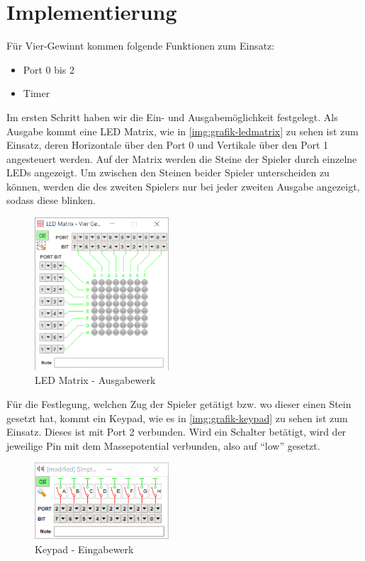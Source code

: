 \FloatBarrier
\chapter{Implementierung}
Für Vier-Gewinnt kommen folgende Funktionen zum Einsatz:
\begin{itemize}	
	\item Port 0 bis 2
	\item Timer
\end{itemize}

Im ersten Schritt haben wir die Ein- und Ausgabemöglichkeit festgelegt. Als Ausgabe kommt eine LED Matrix, wie in \autoref{img:grafik-ledmatrix} zu sehen ist zum Einsatz, deren Horizontale über den Port 0 und Vertikale über den Port 1 angesteuert werden. Auf der Matrix werden die Steine der Spieler durch einzelne LEDs angezeigt.
Um zwischen den Steinen beider Spieler unterscheiden zu können, werden die des zweiten Spielers nur bei jeder zweiten Ausgabe angezeigt, sodass diese blinken.


\begin{figure}
	\centering
	\includegraphics[width=5cm]{ledmatrix.png}
	\caption{LED Matrix - Ausgabewerk}
	\label{img:grafik-ledmatrix}
\end{figure}

Für die Festlegung, welchen Zug der Spieler getätigt bzw. wo dieser einen Stein gesetzt hat, kommt ein Keypad, wie es in \autoref{img:grafik-keypad} zu sehen ist zum Einsatz.
Dieses ist mit Port 2 verbunden. Wird ein Schalter betätigt, wird der jeweilige Pin mit dem Massepotential verbunden, also auf \enquote{low} gesetzt.

\begin{figure}
	\centering
	\includegraphics[width=5cm]{keypad.png}
	\caption{Keypad - Eingabewerk}
	\label{img:grafik-keypad}
\end{figure}

